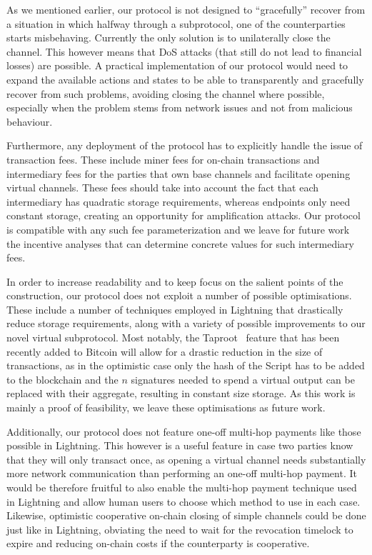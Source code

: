   As we mentioned earlier, our protocol is not designed to ``gracefully'' recover
  from a situation in which halfway through a subprotocol, one of the
  counterparties starts misbehaving. Currently the only solution is to
  unilaterally close the channel. This however means that DoS attacks (that
  still do not lead to financial losses) are possible. A practical
  implementation of our protocol would need to expand the available actions and
  states to be able to transparently and gracefully recover from such problems,
  avoiding closing the channel where possible, especially when the problem stems
  from network issues and not from malicious behaviour.

  Furthermore, any deployment of the protocol has to explicitly handle the issue
  of transaction fees. These include miner fees for on-chain transactions and
  intermediary fees for the parties that own base channels and facilitate
  opening virtual channels. These fees should take into account the fact that
  each intermediary has quadratic storage requirements, whereas endpoints only
  need constant storage, creating an opportunity for amplification attacks. Our
  protocol is compatible with any such fee parameterization and we leave for
  future work the incentive analyses that can determine concrete values for such
  intermediary fees.

  In order to increase readability and to keep focus on the salient points of
  the construction, our protocol does not exploit a number of possible
  optimisations. These include a number of techniques employed in Lightning that
  drastically reduce storage requirements, along with a variety of possible
  improvements to our novel virtual subprotocol. Most notably, the
  Taproot~\cite{taproot} feature that has been recently added to Bitcoin will
  allow for a
  drastic reduction in the size of transactions, as in the optimistic case only
  the hash of the Script has to be added to the blockchain and the $n$
  signatures needed to spend a virtual output can be replaced with their
  aggregate, resulting in constant size storage. As this work is mainly a proof of
  feasibility, we leave these optimisations as future work.

  Additionally, our protocol does not feature one-off multi-hop payments like
  those possible in Lightning. This however is a useful feature in case two
  parties know that they will only transact once, as opening a virtual channel
  needs substantially more network communication than performing an one-off
  multi-hop payment. It would be therefore fruitful to also enable the multi-hop
  payment technique used in Lightning and allow human users to choose which
  method to use in each case. Likewise, optimistic cooperative on-chain closing
  of simple channels could be done just like in Lightning, obviating the need to
  wait for the revocation timelock to expire and reducing on-chain costs if the
  counterparty is cooperative.

